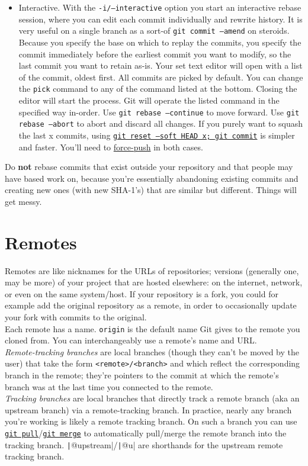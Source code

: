 \documentclass[table, xcdraw]{article}%
\begin{document}
\begin{itemize}
    \item Interactive. With the \texttt{-i/--interactive} option you start an interactive rebase session, where you can edit each commit individually and rewrite history. It is very useful on a single branch as a sort-of \texttt{git commit --amend} on steroids. Because you specify the base on which to replay the commits, you specify the commit immediately before the earliest commit you want to modify, so the last commit you want to retain as-is. Your set text editor will open with a list of the commit, oldest first. All commits are picked by default. You can change the \texttt{pick} command to any of the command listed at the bottom. Closing the editor will start the process. Git will operate the listed command in the specified way in-order. Use \texttt{git rebase --continue} to move forward. Use \texttt{git rebase --abort} to abort and discard all changes. If you purely want to squash the last x commits, using \href{reset}{\texttt{git reset --soft HEAD~x; git commit}} is simpler and faster. You'll need to \href{push}{force-push} in both cases.
\end{itemize}

Do \textbf{not} rebase commits that exist outside your repository and that people may have based work on, because you’re essentially abandoning existing commits and creating new ones (with new SHA-1’s) that are similar but different. Things will get messy.

\section{Remotes} \label{remotes}

Remotes are like nicknames for the URLs of repositories; versions (generally one, may be more) of your project that are hosted elsewhere: on the internet, network, or even on the same system/host. If your repository is a fork, you could for example add the original repository as a remote, in order to occasionally update your fork with commits to the original.\\
Each remote has a name. \texttt{origin} is the default name Git gives to the remote you cloned from. You can interchangeably use a remote's name and URL.\\
\emph{Remote-tracking branches} are local branches (though they can't be moved by the user) that take the form \texttt{<remote>/<branch>} and which reflect the corresponding branch in the remote; they're pointers to the commit at which the remote's branch was at the last time you connected to the remote.\\
\emph{Tracking branches} are local branches that directly track a remote branch (aka an upstream branch) via a remote-tracking branch. In practice, nearly any branch you're working is likely a remote tracking branch. On such a branch you can use \hyperref[pull]{\texttt{git pull}}/\hyperref[merge]{\texttt{git merge}} to automatically pull/merge the remote branch into the tracking branch. \texttt|@{upstream}|/\texttt|@{u}| are shorthands for the upstream remote tracking branch.
\end{document}
